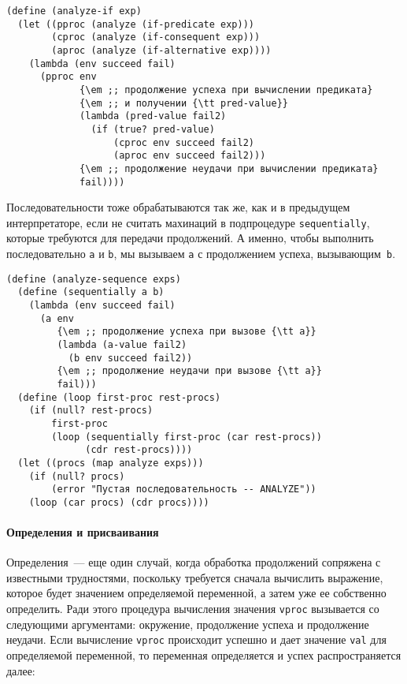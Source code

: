 \begin{Verbatim}[fontsize=\small]
(define (analyze-if exp)
  (let ((pproc (analyze (if-predicate exp)))
        (cproc (analyze (if-consequent exp)))
        (aproc (analyze (if-alternative exp))))
    (lambda (env succeed fail)
      (pproc env
             {\em ;; продолжение успеха при вычислении предиката}
             {\em ;; и получении {\tt pred-value}}
             (lambda (pred-value fail2)
               (if (true? pred-value)
                   (cproc env succeed fail2)
                   (aproc env succeed fail2)))
             {\em ;; продолжение неудачи при вычислении предиката}
             fail))))
\end{Verbatim}

Последовательности тоже обрабатываются так же, как и в
предыдущем интерпретаторе, если не считать махинаций в подпроцедуре
{\tt sequentially}, которые требуются для передачи
продолжений. А именно, чтобы выполнить последовательно {\tt a}
и {\tt b}, мы вызываем {\tt a} с продолжением успеха,
вызывающим~{\tt b}.

\begin{Verbatim}[fontsize=\small]
(define (analyze-sequence exps)
  (define (sequentially a b)
    (lambda (env succeed fail)
      (a env
         {\em ;; продолжение успеха при вызове {\tt a}}
         (lambda (a-value fail2)
           (b env succeed fail2))
         {\em ;; продолжение неудачи при вызове {\tt a}}
         fail)))
  (define (loop first-proc rest-procs)
    (if (null? rest-procs)
        first-proc
        (loop (sequentially first-proc (car rest-procs))
              (cdr rest-procs))))
  (let ((procs (map analyze exps)))
    (if (null? procs)
        (error "Пустая последовательность -- ANALYZE"))
    (loop (car procs) (cdr procs))))
\end{Verbatim}

\paragraph{Определения и присваивания}

Определения~--- еще один случай, когда обработка продолжений
сопряжена с известными трудностями, поскольку требуется сначала
вычислить выражение, которое будет значением определяемой переменной,
а затем уже ее собственно определить.  Ради этого процедура
вычисления значения {\tt vproc} вызывается со следующими
аргументами: окружение, продолжение успеха и продолжение неудачи.  Если
вычисление {\tt vproc} происходит успешно и дает значение {\tt val}
для определяемой переменной, то переменная определяется и успех
распространяется далее:

